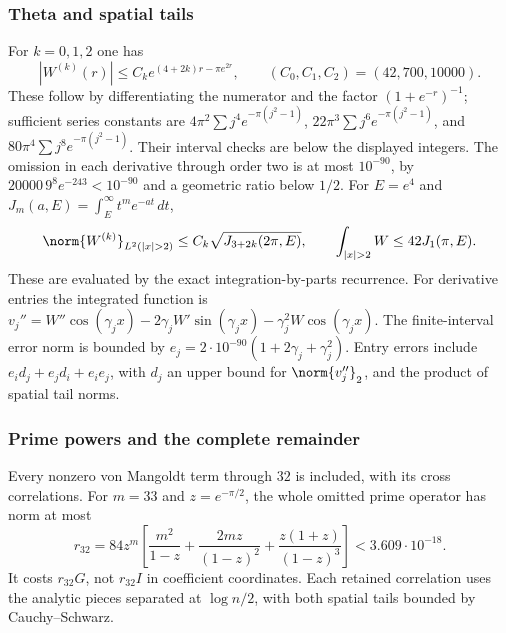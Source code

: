 \documentclass[11pt,a4paper]{article}
\numberwithin{equation}{section}
\theoremstyle{definition}\newtheorem{definition}[theorem]{Definition}
\theoremstyle{remark}\newtheorem{remark}[theorem]{Remark}
\begin{document}
\subsubsection*{Theta and spatial tails}
For $k=0,1,2$ one has
\[
 |W^{(k)}(r)|\le C_ke^{(4+2k)r-\pi e^{2r}},\qquad
 (C_0,C_1,C_2)=(42,700,10000).
\]
These follow by differentiating the numerator and the factor
$(1+e^{-r})^{-1}$; sufficient series constants are
$4\pi^2\sum j^4e^{-\pi(j^2-1)}$,
$22\pi^3\sum j^6e^{-\pi(j^2-1)}$, and
$80\pi^4\sum j^8e^{-\pi(j^2-1)}$.
Their interval checks are below the displayed integers.
The omission in each derivative through order two is at most
$10^{-90}$, by
$20000\,9^8e^{-243}<10^{-90}$ and a geometric ratio below $1/2$.
For $E=e^4$ and $J_m(a,E)=\int_E^\infty t^me^{-at}\,dt$,
\[
 \norm{W^{(k)}}_{L^2(|x|>2)}\le C_k\sqrt{J_{3+2k}(2\pi,E)},
 \qquad \int_{|x|>2}W\le42J_1(\pi,E).
\]
These are evaluated by the exact integration-by-parts recurrence.
For derivative entries the integrated function is
$v_j''=W''\cos(\gamma_jx)-2\gamma_jW'\sin(\gamma_jx)
-\gamma_j^2W\cos(\gamma_jx)$.
The finite-interval error norm is bounded by
$e_j=2\cdot10^{-90}(1+2\gamma_j+\gamma_j^2)$.
Entry errors include $e_id_j+e_jd_i+e_ie_j$, with $d_j$ an upper
bound for $\norm{v_j''}_2$, and the product of spatial tail norms.

\subsubsection*{Prime powers and the complete remainder}
Every nonzero von Mangoldt term through $32$ is included, with its
cross correlations. For $m=33$ and $z=e^{-\pi/2}$, the whole omitted
prime operator has norm at most
\[
 r_{32}=84z^m\left[\frac{m^2}{1-z}+\frac{2mz}{(1-z)^2}
                          +\frac{z(1+z)}{(1-z)^3}\right]
 <3.609\cdot10^{-18}.
\]
It costs $r_{32}G$, not $r_{32}I$ in coefficient coordinates.
Each retained correlation uses the analytic pieces separated at
$\log n/2$, with both spatial tails bounded by Cauchy--Schwarz.
\end{document}
